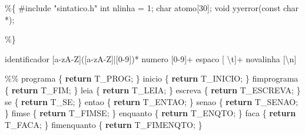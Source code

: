 \documentclass[
  brazilian,
  letterpaper,
]{book}
\newenvironment{Shaded}{\begin{snugshade}}{\end{snugshade}}
\newcommand{\ControlFlowTok}[1]{\textcolor[rgb]{0.00,0.23,0.31}{\textbf{#1}}}
\newcommand{\DataTypeTok}[1]{\textcolor[rgb]{0.68,0.00,0.00}{#1}}
\newcommand{\DecValTok}[1]{\textcolor[rgb]{0.68,0.00,0.00}{#1}}
\newcommand{\ImportTok}[1]{\textcolor[rgb]{0.00,0.46,0.62}{#1}}
\newcommand{\NormalTok}[1]{\textcolor[rgb]{0.00,0.23,0.31}{#1}}
\newcommand{\OperatorTok}[1]{\textcolor[rgb]{0.37,0.37,0.37}{#1}}
\newcommand{\PreprocessorTok}[1]{\textcolor[rgb]{0.68,0.00,0.00}{#1}}
\theoremstyle{plain}
\theoremstyle{definition}
\theoremstyle{remark}
\begin{document}
\begin{Shaded}
\begin{Highlighting}[]
\OperatorTok{\%\{}
\PreprocessorTok{\#include }\ImportTok{"sintatico.h"}
\DataTypeTok{int}\NormalTok{ nlinha }\OperatorTok{=} \DecValTok{1}\OperatorTok{;}
\DataTypeTok{char}\NormalTok{ atomo}\OperatorTok{[}\DecValTok{30}\OperatorTok{];}
\DataTypeTok{void}\NormalTok{ yyerror}\OperatorTok{(}\DataTypeTok{const} \DataTypeTok{char} \OperatorTok{*);}

\OperatorTok{\%\}}

\NormalTok{identificador }\OperatorTok{[}\NormalTok{a}\OperatorTok{{-}}\NormalTok{zA}\OperatorTok{{-}}\NormalTok{Z}\OperatorTok{]([}\NormalTok{a}\OperatorTok{{-}}\NormalTok{zA}\OperatorTok{{-}}\NormalTok{Z}\OperatorTok{]|[}\DecValTok{0}\OperatorTok{{-}}\DecValTok{9}\OperatorTok{])*}
\NormalTok{numero }\OperatorTok{[}\DecValTok{0}\OperatorTok{{-}}\DecValTok{9}\OperatorTok{]+}
\NormalTok{espaco }\OperatorTok{[}\NormalTok{ \textbackslash{}t}\OperatorTok{]+}
\NormalTok{novalinha }\OperatorTok{[}\NormalTok{\textbackslash{}n}\OperatorTok{]}

\OperatorTok{\%\%}
\NormalTok{programa          }\OperatorTok{\{} \ControlFlowTok{return}\NormalTok{ T\_PROG}\OperatorTok{;} \OperatorTok{\}}
\NormalTok{inicio            }\OperatorTok{\{} \ControlFlowTok{return}\NormalTok{ T\_INICIO}\OperatorTok{;} \OperatorTok{\}}
\NormalTok{fimprograma       }\OperatorTok{\{} \ControlFlowTok{return}\NormalTok{ T\_FIM}\OperatorTok{;} \OperatorTok{\}}
\NormalTok{leia              }\OperatorTok{\{} \ControlFlowTok{return}\NormalTok{ T\_LEIA}\OperatorTok{;} \OperatorTok{\}}
\NormalTok{escreva           }\OperatorTok{\{} \ControlFlowTok{return}\NormalTok{ T\_ESCREVA}\OperatorTok{;} \OperatorTok{\}}
\NormalTok{se                }\OperatorTok{\{} \ControlFlowTok{return}\NormalTok{ T\_SE}\OperatorTok{;} \OperatorTok{\}}
\NormalTok{entao             }\OperatorTok{\{} \ControlFlowTok{return}\NormalTok{ T\_ENTAO}\OperatorTok{;} \OperatorTok{\}}
\NormalTok{senao             }\OperatorTok{\{} \ControlFlowTok{return}\NormalTok{ T\_SENAO}\OperatorTok{;} \OperatorTok{\}}
\NormalTok{fimse             }\OperatorTok{\{} \ControlFlowTok{return}\NormalTok{ T\_FIMSE}\OperatorTok{;} \OperatorTok{\}}
\NormalTok{enquanto          }\OperatorTok{\{} \ControlFlowTok{return}\NormalTok{ T\_ENQTO}\OperatorTok{;} \OperatorTok{\}}
\NormalTok{faca              }\OperatorTok{\{} \ControlFlowTok{return}\NormalTok{ T\_FACA}\OperatorTok{;} \OperatorTok{\}}
\NormalTok{fimenquanto       }\OperatorTok{\{} \ControlFlowTok{return}\NormalTok{ T\_FIMENQTO}\OperatorTok{;} \OperatorTok{\}}


\end{Highlighting}
\end{Shaded}
\end{document}

